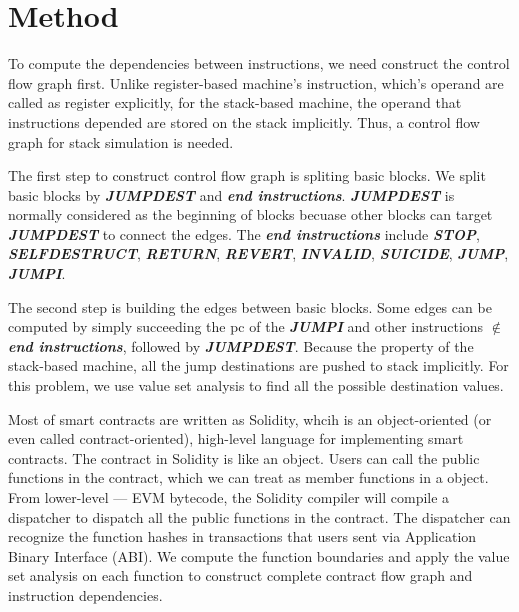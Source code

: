 \documentclass{article}
\begin{document}
\section{Method}
\label{sec:method}

To compute the dependencies between instructions, we need construct the control flow graph first. Unlike register-based machine's instruction, which's operand are called as register explicitly, for the stack-based machine, the operand that instructions depended are stored on the stack implicitly. Thus, a control flow graph for stack simulation is needed.


The first step to construct control flow graph is spliting basic blocks. We split basic blocks by \textbf{\textit{JUMPDEST}} and \textbf{\textit{end instructions}}. \textbf{\textit{JUMPDEST}} is normally considered as the beginning of blocks becuase other blocks can target \textbf{\textit{JUMPDEST}} to connect the edges. The \textbf{\textit{end instructions}} include \textbf{\textit{STOP}}, \textbf{\textit{SELFDESTRUCT}}, \textbf{\textit{RETURN}}, \textbf{\textit{REVERT}}, \textbf{\textit{INVALID}}, \textbf{\textit{SUICIDE}}, \textbf{\textit{JUMP}}, \textbf{\textit{JUMPI}}.

The second step is building the edges between basic blocks. Some edges can be computed by simply succeeding the pc of the \textbf{\textit{JUMPI}} and other instructions $\notin$ \textbf{\textit{end instructions}}, followed by \textbf{\textit{JUMPDEST}}. Because the property of the stack-based machine, all the jump destinations are pushed to stack implicitly. For this problem, we use value set analysis to find all the possible destination values.

Most of smart contracts are written as Solidity, whcih is an object-oriented (or even called contract-oriented), high-level language for implementing smart contracts. The contract in Solidity is like an object. Users can call the public functions in the contract, which we can treat as member functions in a object. From lower-level --- EVM bytecode, the Solidity compiler will compile a dispatcher to dispatch all the public functions in the contract. The dispatcher can recognize the function hashes in transactions that users sent via Application Binary Interface (ABI). We compute the function boundaries and apply the value set analysis on each function to construct complete contract flow graph and instruction dependencies.
\end{document}
